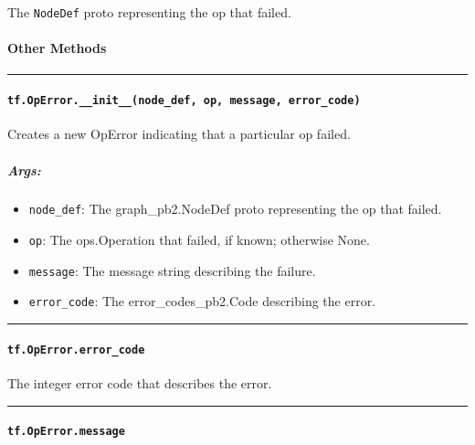 The \texttt{NodeDef} proto representing the op that failed.

\paragraph{Other Methods }\label{other-methods}

\begin{center}\rule{0.5\linewidth}{\linethickness}\end{center}

\paragraph{\texorpdfstring{\texttt{tf.OpError.\_\_init\_\_(node\_def,\ op,\ message,\ error\_code)}
}{tf.OpError.\_\_init\_\_(node\_def, op, message, error\_code) }}\label{tf.operror.ux5fux5finitux5fux5fnodeux5fdef-op-message-errorux5fcode}

Creates a new OpError indicating that a particular op failed.

\subparagraph{Args: }\label{args-3}

\begin{itemize}
\tightlist
\item
  \texttt{node\_def}: The graph\_pb2.NodeDef proto representing the op
  that failed.
\item
  \texttt{op}: The ops.Operation that failed, if known; otherwise None.
\item
  \texttt{message}: The message string describing the failure.
\item
  \texttt{error\_code}: The error\_codes\_pb2.Code describing the error.
\end{itemize}

\begin{center}\rule{0.5\linewidth}{\linethickness}\end{center}

\paragraph{\texorpdfstring{\texttt{tf.OpError.error\_code}
}{tf.OpError.error\_code }}\label{tf.operror.errorux5fcode}

The integer error code that describes the error.

\begin{center}\rule{0.5\linewidth}{\linethickness}\end{center}

\paragraph{\texorpdfstring{\texttt{tf.OpError.message}
}{tf.OpError.message }}\label{tf.operror.message}

